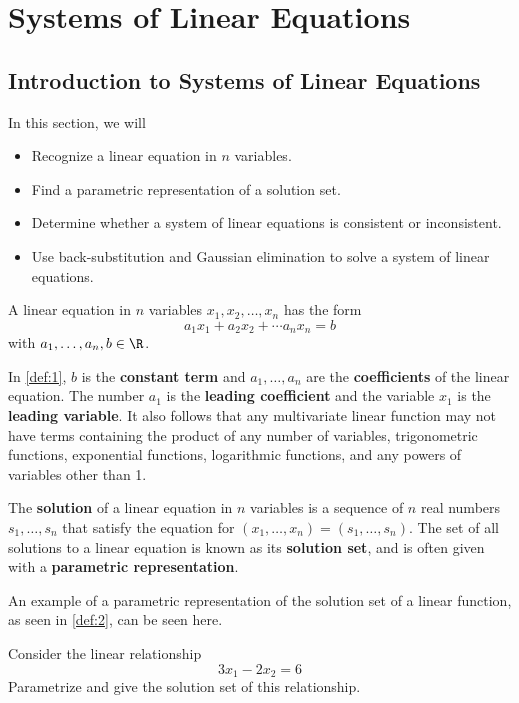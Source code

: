 \chapter{Systems of Linear Equations}
\section{Introduction to Systems of Linear Equations}
In this section, we will
\begin{itemize}
	\item Recognize a linear equation in $n$ variables.
	\item Find a parametric representation of a solution set.
	\item Determine whether a system of linear equations is consistent or inconsistent.
	\item Use back-substitution and Gaussian elimination to solve a system of linear equations.
\end{itemize}
\begin{definition}\label{def:1}
	A linear equation in $n$ variables $x_1,x_2,\ldots,x_n$ has the form
	$$a_1x_1+a_2x_2+\cdots a_nx_n=b$$
	with $a_1,\ldots,a_n,b\in\R$.
\end{definition}
In \ref{def:1}, $b$ is the \textbf{constant term} and $a_1,\ldots,a_n$ are the \textbf{coefficients} of the linear equation. The number $a_1$ is the \textbf{leading coefficient} and the variable $x_1$ is the \textbf{leading variable}. It also follows that any multivariate linear function may not have terms containing the product of any number of variables, trigonometric functions, exponential functions, logarithmic functions, and any powers of variables other than 1.\\
\begin{definition}\label{def:2}
	The \textbf{solution} of a linear equation in $n$ variables is a sequence of $n$ real numbers $s_1,\ldots,s_n$ that satisfy the equation for $(x_1,\ldots,x_n)=(s_1,\ldots,s_n)$. The set of all solutions to a linear equation is known as its \textbf{solution set}, and is often given with a \textbf{parametric representation}.
\end{definition}
An example of a parametric representation of the solution set of a linear function, as seen in \ref{def:2}, can be seen here.
\begin{eg}
	Consider the linear relationship
	$$3x_1-2x_2=6$$
	Parametrize and give the solution set of this relationship.
\end{eg}
